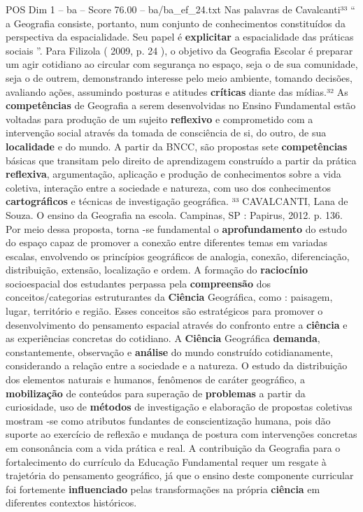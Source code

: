 \begin{textsample}{POS Dim 1 – ba – Score 76.00 – ba/ba\_ef\_24.txt}
Nas palavras de Cavalcanti³³ “ a Geografia consiste, portanto, num conjunto de conhecimentos constituídos da perspectiva da espacialidade.
Seu papel é \textbf{explicitar} a espacialidade das práticas sociais ”.
Para Filizola ( 2009, p. 24 ), o objetivo da Geografia Escolar é preparar um agir cotidiano ao circular com segurança no espaço, seja o de sua comunidade, seja o de outrem, demonstrando interesse pelo meio ambiente, tomando decisões, avaliando ações, assumindo posturas e atitudes \textbf{críticas} diante das mídias.³² As \textbf{competências} de Geografia a serem desenvolvidas no Ensino Fundamental estão voltadas para produção de um sujeito \textbf{reflexivo} e comprometido com a intervenção social através da tomada de consciência de si, do outro, de sua \textbf{localidade} e do mundo.
A partir da BNCC, são propostas sete \textbf{competências} básicas que transitam pelo direito de aprendizagem construído a partir da prática \textbf{reflexiva}, argumentação, aplicação e produção de conhecimentos sobre a vida coletiva, interação entre a sociedade e natureza, com uso dos conhecimentos \textbf{cartográficos} e técnicas de investigação geográfica. ³³ CAVALCANTI, Lana de Souza.
O ensino da Geografia na escola.
Campinas, SP : Papirus, 2012. p. 136.
Por meio dessa proposta, torna -se fundamental o \textbf{aprofundamento} do estudo do espaço capaz de promover a conexão entre diferentes temas em variadas escalas, envolvendo os princípios geográficos de analogia, conexão, diferenciação, distribuição, extensão, localização e ordem.
A formação do \textbf{raciocínio} socioespacial dos estudantes perpassa pela \textbf{compreensão} dos conceitos/categorias estruturantes da \textbf{Ciência} Geográfica, como : paisagem, lugar, território e região.
Esses conceitos são estratégicos para promover o desenvolvimento do pensamento espacial através do confronto entre a \textbf{ciência} e as experiências concretas do cotidiano.
A \textbf{Ciência} Geográfica \textbf{demanda}, constantemente, observação e \textbf{análise} do mundo construído cotidianamente, considerando a relação entre a sociedade e a natureza.
O estudo da distribuição dos elementos naturais e humanos, fenômenos de caráter geográfico, a \textbf{mobilização} de conteúdos para superação de \textbf{problemas} a partir da curiosidade, uso de \textbf{métodos} de investigação e elaboração de propostas coletivas mostram -se como atributos fundantes de conscientização humana, pois dão suporte ao exercício de reflexão e mudança de postura com intervenções concretas em consonância com a vida prática e real.
A contribuição da Geografia para o fortalecimento do currículo da Educação Fundamental requer um resgate à trajetória do pensamento geográfico, já que o ensino deste componente curricular foi fortemente \textbf{influenciado} pelas transformações na própria \textbf{ciência} em diferentes contextos históricos.

\end{textsample}
